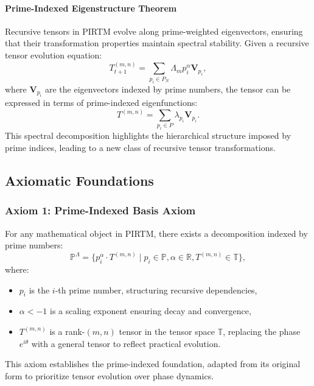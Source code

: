 \documentclass[12pt]{article}
\begin{document}
\paragraph{Prime-Indexed Eigenstructure Theorem}
Recursive tensors in PIRTM evolve along prime-weighted eigenvectors, ensuring that their transformation properties maintain spectral stability. Given a recursive tensor evolution equation:
\begin{equation}
    T_{t+1}^{(m,n)} = \sum_{p_i \in P_N} \Lambda_m p_i^\alpha \mathbf{V}_{p_i},
\end{equation}
where \( \mathbf{V}_{p_i} \) are the eigenvectors indexed by prime numbers, the tensor can be expressed in terms of prime-indexed eigenfunctions:
\begin{equation}
    T^{(m,n)} = \sum_{p_i \in P} \lambda_{p_i} \mathbf{V}_{p_i}.
\end{equation}
This spectral decomposition highlights the hierarchical structure imposed by prime indices, leading to a new class of recursive tensor transformations.

 \subsection{Axiomatic Foundations}

 \subsubsection{Axiom 1: Prime-Indexed Basis Axiom}
For any mathematical object in PIRTM, there exists a decomposition indexed by prime numbers:
\begin{equation}
    \mathbb{P}^\Lambda = \{ p_i^\alpha \cdot T^{(m,n)} \mid p_i \in \mathbb{P}, \alpha \in \mathbb{R}, T^{(m,n)} \in \mathbb{T} \},
\end{equation}
where:
\begin{itemize}
    \item \( p_i \) is the \( i \)-th prime number, structuring recursive dependencies,
    \item \( \alpha < -1 \) is a scaling exponent ensuring decay and convergence,
    \item \( T^{(m,n)} \) is a rank-$(m,n)$ tensor in the tensor space \( \mathbb{T} \), replacing the phase \( e^{i\theta} \) with a general tensor to reflect practical evolution.
\end{itemize}
This axiom establishes the prime-indexed foundation, adapted from its original form to prioritize tensor evolution over phase dynamics.
\end{document}
